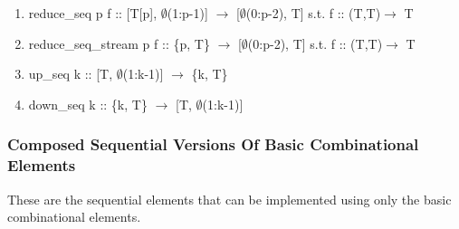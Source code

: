 \documentclass[11pt,fleqn]{article}
\numberwithin{equation}{subsection}
\begin{document}
\begin{enumerate}
    \item reduce\_seq p f :: [T[p], $\emptyset$(1:p-1)] $\rightarrow$ [$\emptyset$(0:p-2), T]
        \subitem s.t. f :: (T,T)$\rightarrow$ T
    \item reduce\_seq\_stream p f :: \{p, T\} $\rightarrow$ [$\emptyset$(0:p-2), T]
        \subitem s.t. f :: (T,T)$\rightarrow$ T
    \item up\_seq k :: [T, $\emptyset$(1:k-1)] $\rightarrow$ \{k, T\}
    \item down\_seq k :: \{k, T\} $\rightarrow$ [T, $\emptyset$(1:k-1)]
\end{enumerate}

\subsubsection{Composed Sequential Versions Of Basic Combinational Elements}
These are the sequential elements that can be implemented using only the basic
combinational elements.
\end{document}
